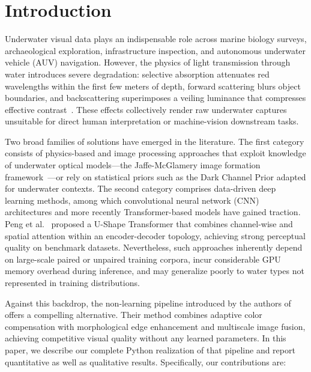 \documentclass[conference]{IEEEtran}
\begin{document}
\section{Introduction}

Underwater visual data plays an indispensable role across marine biology surveys, archaeological exploration, infrastructure inspection, and autonomous underwater vehicle (AUV) navigation. However, the physics of light transmission through water introduces severe degradation: selective absorption attenuates red wavelengths within the first few meters of depth, forward scattering blurs object boundaries, and backscattering superimposes a veiling luminance that compresses effective contrast~\cite{schettini2010}. These effects collectively render raw underwater captures unsuitable for direct human interpretation or machine-vision downstream tasks.

Two broad families of solutions have emerged in the literature. The first category consists of physics-based and image processing approaches that exploit knowledge of underwater optical models---the Jaffe-McGlamery image formation framework~\cite{akkaynak2018}---or rely on statistical priors such as the Dark Channel Prior adapted for underwater contexts. The second category comprises data-driven deep learning methods, among which convolutional neural network (CNN) architectures and more recently Transformer-based models have gained traction. Peng et al.~\cite{peng2023ushape} proposed a U-Shape Transformer that combines channel-wise and spatial attention within an encoder-decoder topology, achieving strong perceptual quality on benchmark datasets. Nevertheless, such approaches inherently depend on large-scale paired or unpaired training corpora, incur considerable GPU memory overhead during inference, and may generalize poorly to water types not represented in training distributions.

Against this backdrop, the non-learning pipeline introduced by the authors of~\cite{basepaper2026} offers a compelling alternative. Their method combines adaptive color compensation with morphological edge enhancement and multiscale image fusion, achieving competitive visual quality without any learned parameters. In this paper, we describe our complete Python realization of that pipeline and report quantitative as well as qualitative results. Specifically, our contributions are:
\end{document}
